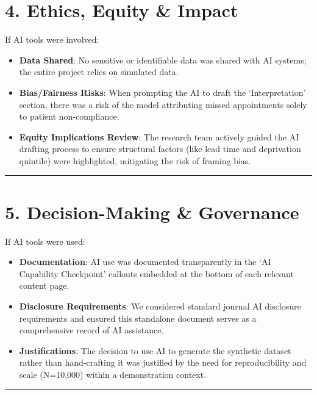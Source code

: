 \documentclass[
]{report}
\providecommand{\tightlist}{%
  \setlength{\itemsep}{0pt}\setlength{\parskip}{0pt}}
\begin{document}
\section{4. Ethics, Equity \& Impact}\label{ethics-equity-impact}

If AI tools were involved:

\begin{itemize}
\tightlist
\item
  \textbf{Data Shared}: No sensitive or identifiable data was shared
  with AI systems; the entire project relies on simulated data.
\item
  \textbf{Bias/Fairness Risks}: When prompting the AI to draft the
  `Interpretation' section, there was a risk of the model attributing
  missed appointments solely to patient non-compliance.
\item
  \textbf{Equity Implications Review}: The research team actively guided
  the AI drafting process to ensure structural factors (like lead time
  and deprivation quintile) were highlighted, mitigating the risk of
  framing bias.
\end{itemize}

\begin{center}\rule{0.5\linewidth}{0.5pt}\end{center}

\section{5. Decision-Making \&
Governance}\label{decision-making-governance}

If AI tools were used:

\begin{itemize}
\tightlist
\item
  \textbf{Documentation}: AI use was documented transparently in the `AI
  Capability Checkpoint' callouts embedded at the bottom of each
  relevant content page.
\item
  \textbf{Disclosure Requirements}: We considered standard journal AI
  disclosure requirements and ensured this standalone document serves as
  a comprehensive record of AI assistance.
\item
  \textbf{Justifications}: The decision to use AI to generate the
  synthetic dataset rather than hand-crafting it was justified by the
  need for reproducibility and scale (N=10,000) within a demonstration
  context.
\end{itemize}

\begin{center}\rule{0.5\linewidth}{0.5pt}\end{center}
\end{document}
